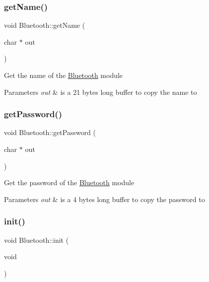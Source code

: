 \subsubsection{\texorpdfstring{getName()}{getName()}}
{\footnotesize\ttfamily void Bluetooth\+::get\+Name (\begin{DoxyParamCaption}\item[{char $\ast$}]{out }\end{DoxyParamCaption})}

Get the name of the \mbox{\hyperlink{namespace_bluetooth}{Bluetooth}} module


\begin{DoxyParams}{Parameters}
{\em out} & is a 21 bytes long buffer to copy the name to \\
\hline
\end{DoxyParams}
\mbox{\label{namespace_bluetooth_aa4106d9b9a752c4dbf6ae8e098a4a5b6}} 
\subsubsection{\texorpdfstring{getPassword()}{getPassword()}}
{\footnotesize\ttfamily void Bluetooth\+::get\+Password (\begin{DoxyParamCaption}\item[{char $\ast$}]{out }\end{DoxyParamCaption})}

Get the password of the \mbox{\hyperlink{namespace_bluetooth}{Bluetooth}} module


\begin{DoxyParams}{Parameters}
{\em out} & is a 4 bytes long buffer to copy the password to \\
\hline
\end{DoxyParams}
\mbox{\label{namespace_bluetooth_af5eca873435207a9ebc7d940f94b4464}} 
\subsubsection{\texorpdfstring{init()}{init()}}
{\footnotesize\ttfamily void Bluetooth\+::init (\begin{DoxyParamCaption}\item[{void}]{ }\end{DoxyParamCaption})}


